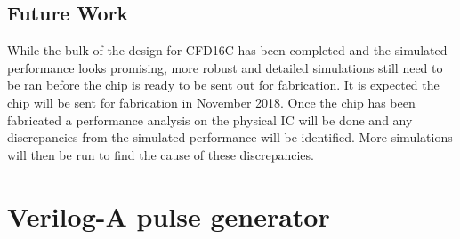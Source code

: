\documentclass[12pt,oneside,final]{siuethesis}
\theoremstyle{definition}
\begin{document}
\section{Future Work}
\par While the bulk of the design for CFD16C has been completed and the simulated performance looks promising, more robust and detailed simulations still need to be ran before the chip is ready to be sent out for fabrication. It is expected the chip will be sent for fabrication in November 2018. Once the chip has been fabricated a performance analysis on the physical IC will be done and any discrepancies from the simulated performance will be identified. More simulations will then be run to find the cause of these discrepancies. 

\nocite{*}









\multipleappendices
{}

\chapter{Verilog-A pulse generator}

\end{document}
